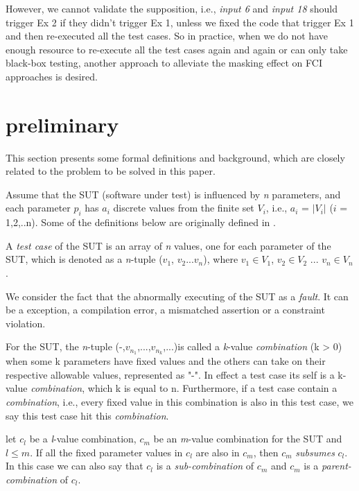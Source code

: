 \documentclass{sig-alternate}
\begin{document}
However, we cannot validate the supposition, i.e., \emph{input 6} and \emph{input 18} should trigger Ex 2 if they didn't trigger Ex 1, unless we fixed the code that trigger Ex 1 and then re-executed all the test cases. So in practice, when we do not have enough resource to re-execute all the test cases again and again or can only take black-box testing, another approach to alleviate the masking effect on FCI approaches is desired.

\section{preliminary}
This section presents some formal definitions and background, which are closely related to the problem to be solved in this paper.

Assume that the SUT (software under test) is influenced by \emph{n} parameters, and each parameter $p_{i}$ has $a_{i}$ discrete values from the finite set $V_{i}$, i.e., $a_{i}$ = $|V_{i}|$ ($i$ = 1,2,..n). Some of the definitions below are originally defined in \cite{nie2011survey}.

\begin{definition}
A \emph{test case} of the SUT is an array of \emph{n} values, one for each parameter of the SUT, which is denoted as a \emph{n}-tuple ($v_{1}$, $v_{2}$...$v_{n}$), where $v_{1}\in V_{1}$, $v_{2} \in V_{2}$ ... $v_{n} \in V_{n}$.
\end{definition}

\begin{definition}
We consider the fact that the abnormally executing of the SUT as a \emph{fault}. It can be a exception, a compilation error, a mismatched assertion or a constraint violation.
\end{definition}

\begin{definition}
For the SUT, the \emph{n}-tuple (-,$v_{n_{1}}$,...,$v_{n_{k}}$,...)is called a \emph{k}-value \emph{combination} (k > 0) when some k parameters have fixed values and the others can take on their respective allowable values, represented as "-". In effect a test case its self is a k-value \emph{combination}, which k is equal to n. Furthermore, if a test case contain a \emph{combination}, i.e., every fixed value in this combination is also in this test case, we say this test case hit this \emph{combination}.
\end{definition}

\begin{definition}
let $c_{l}$ be a \emph{l}-value combination, $c_{m}$ be an \emph{m}-value combination for the SUT and $l \leq m$. If all the fixed parameter values in $c_{l}$ are also in $c_{m}$, then $c_{m}$ \emph{subsumes} $c_{l}$. In this case we can also say that $c_{l}$ is a \emph{sub-combination} of $c_{m}$ and $c_{m}$ is a \emph{parent-combination} of $c_{l}$.
\end{definition}
\end{document}
